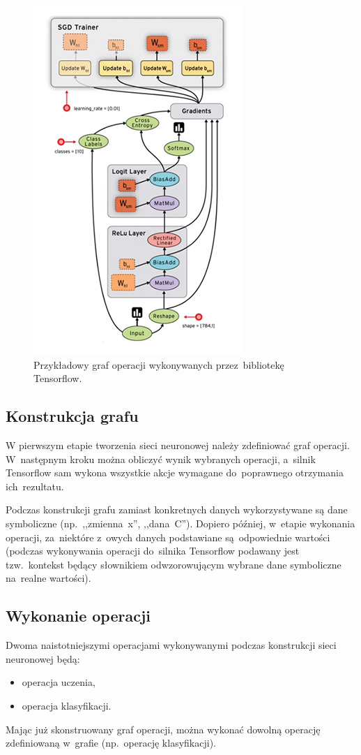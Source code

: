 \begin{figure}[H]
	\centering
	\includegraphics[width=0.5\linewidth]{img/tf-sample-graph.jpg}
	\caption{Przykładowy graf operacji wykonywanych przez~bibliotekę Tensorflow.}
	\label{img:tf-smpl-grf}
\end{figure}

\subsection{Konstrukcja grafu}
W pierwszym etapie tworzenia sieci neuronowej należy zdefiniować graf operacji. W~następnym kroku można obliczyć
wynik wybranych operacji, a~silnik Tensorflow sam wykona wszystkie akcje wymagane do~poprawnego otrzymania
ich~rezultatu.

Podczas konstrukcji grafu zamiast konkretnych danych wykorzystywane są dane symboliczne (np.~,,zmienna~x'',
,,dana~C''). Dopiero później, w~etapie wykonania operacji, za~niektóre z~owych danych podstawiane
są~odpowiednie wartości (podczas wykonywania operacji do~silnika Tensorflow podawany jest tzw.~kontekst będący
słownikiem odwzorowującym wybrane dane symboliczne na~realne wartości).


\subsection{Wykonanie operacji}
Dwoma naistotniejszymi operacjami wykonywanymi podczas konstrukcji sieci neuronowej będą:
\begin{itemize}
    \item operacja uczenia,
    \item operacja klasyfikacji.
\end{itemize}

Mając już skonstruowany graf operacji, można wykonać dowolną operację zdefiniowaną w~grafie (np.~operację klasyfikacji).


